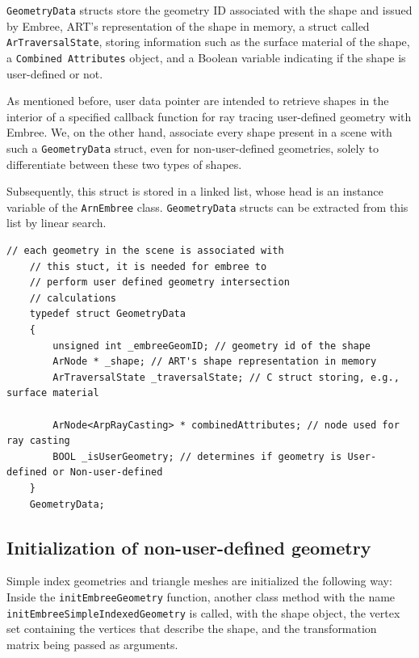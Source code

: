 \texttt{GeometryData} structs store the geometry ID associated with the shape and issued by Embree, ART's representation of the shape in memory, a struct called  \texttt{ArTraversalState}, storing information such as the surface material of the shape, a \texttt{Combined Attributes} object, and a Boolean variable indicating if the shape is user-defined or not.

As mentioned before, user data pointer are intended to retrieve shapes in the interior of a specified callback function for ray tracing user-defined geometry with Embree. We, on the other hand, associate every shape present in a scene with such a \texttt{GeometryData} struct, even for non-user-defined geometries, solely to differentiate between these two types of shapes.

Subsequently, this struct is stored in a linked list, whose head is an instance variable of the \texttt{ArnEmbree} class. \texttt{GeometryData} structs can be extracted from this list by linear search.
 

\begin{listing} 
	\begin{lstlisting}[caption={\texttt{C} struct associated with each initialized geometry.}, label={lst:geometry_data}]
	// each geometry in the scene is associated with
	// this stuct, it is needed for embree to
	// perform user defined geometry intersection
	// calculations
	typedef struct GeometryData 
	{
		unsigned int _embreeGeomID; // geometry id of the shape
		ArNode * _shape; // ART's shape representation in memory
		ArTraversalState _traversalState; // C struct storing, e.g., surface material
		
		ArNode<ArpRayCasting> * combinedAttributes; // node used for ray casting
		BOOL _isUserGeometry; // determines if geometry is User-defined or Non-user-defined
	}
	GeometryData;
	\end{lstlisting}
\end{listing} 

\subsection{Initialization of non-user-defined geometry}
Simple index geometries and triangle meshes are initialized the following way: Inside the \texttt{initEmbreeGeometry} function, another class method with the name \texttt{initEmbreeSimpleIndexedGeometry} is called, with the shape object, the vertex set containing the vertices that describe the shape, and the transformation matrix being passed as arguments. 
\\
\\

